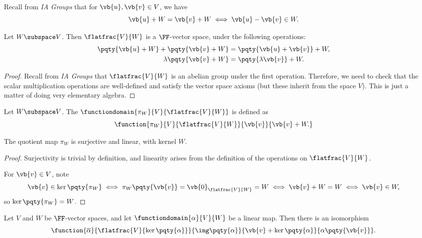 \begin{remark}
    Recall from \textit{IA Groups} that for \(\vb{u}, \vb{v} \in V\), we have
    \[
        \vb{u} + W = \vb{v} + W \iff \vb{u} - \vb{v} \in W.
    \]
\end{remark}

\begin{proposition}
    Let \(W \subspace V\). Then \(\flatfrac{V}{W}\) is a \(\FF\)-vector space, under the following operations:
    \begin{align*}
        \pqty{\vb{u} + W} + \pqty{\vb{v} + W} &= \pqty{\vb{u} + \vb{v}} + W, \\
        \lambda \pqty{\vb{v} + W} &= \pqty{\lambda \vb{v}} + W.
    \end{align*}
\end{proposition}

\begin{proof}
    Recall from \textit{IA Groups} that \(\flatfrac{V}{W}\) is an abelian group under the first operation. Therefore, we need to check that the scalar multiplication operations are well-defined and satisfy the vector space axioms (but these inherit from the space \(V\)). This is just a matter of doing very elementary algebra.
\end{proof}

\begin{definition}
    Let \(W \subspace V\). The  \(\functiondomain{\pi_{W}}{V}{\flatfrac{V}{W}}\) is defined as
    \[
        \function{\pi_{W}}{V}{\flatfrac{V}{W}}{\vb{v}}{\vb{v} + W.}
    \]
\end{definition}

\begin{proposition}
    The quotient map \(\pi_{W}\) is surjective and linear, with kernel \(W\).
\end{proposition}

\begin{proof}
    Surjectivity is trivial by definition, and linearity arises from the definition of the operations on \(\flatfrac{V}{W}\). 

    For \(\vb{v} \in V\), note
    \[
        \vb{v} \in \ker\pqty{\pi_{W}} \iff \pi_{W}\pqty{\vb{v}} = \vb{0}_{\flatfrac{V}{W}} = W \iff \vb{v} + W = W \iff \vb{v} \in W,
    \]
    so \(\ker\pqty{\pi_{W}} = W\).
\end{proof}

\begin{theorem}
    \label{thm:first-isomorphism-theorem}%
    Let \(V\) and \(W\) be \(\FF\)-vector spaces, and let \(\functiondomain{\alpha}{V}{W}\) be a linear map. Then there is an isomorphism
    \[
        \function{\overline{\alpha}}{\flatfrac{V}{\ker\pqty{\alpha}}}{\img\pqty{\alpha}}{\vb{v} + \ker\pqty{\alpha}}{\alpha\pqty{\vb{v}}}.
    \]
\end{theorem}

